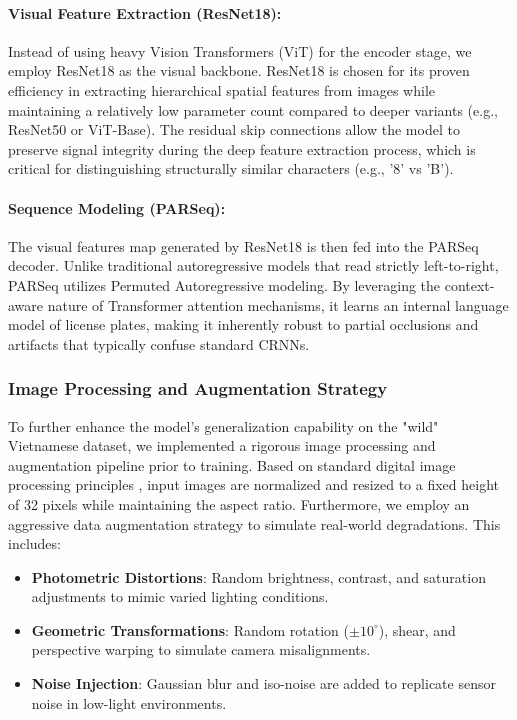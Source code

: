 \documentclass[a4paper,11pt,twocolumn]{article}
\begin{document}
	\paragraph{Visual Feature Extraction (ResNet18):}
	Instead of using heavy Vision Transformers (ViT) for the encoder stage, we employ ResNet18 \cite{He2015DeepRL} as the visual backbone. ResNet18 is chosen for its proven efficiency in extracting hierarchical spatial features from images while maintaining a relatively low parameter count compared to deeper variants (e.g., ResNet50 or ViT-Base). The residual skip connections allow the model to preserve signal integrity during the deep feature extraction process, which is critical for distinguishing structurally similar characters (e.g., '8' vs 'B').
	
	\paragraph{Sequence Modeling (PARSeq):}
	The visual features map generated by ResNet18 is then fed into the PARSeq \cite{Bautista2022SceneTR} decoder. Unlike traditional autoregressive models that read strictly left-to-right, PARSeq utilizes Permuted Autoregressive modeling. By leveraging the context-aware nature of Transformer attention mechanisms, it learns an internal language model of license plates, making it inherently robust to partial occlusions and artifacts that typically confuse standard CRNNs.
	
	\subsubsection{Image Processing and Augmentation Strategy}
	
	To further enhance the model's generalization capability on the "wild" Vietnamese dataset, we implemented a rigorous image processing and augmentation pipeline prior to training.
	Based on standard digital image processing principles \cite{Gonzalez2018DigitalIP}, input images are normalized and resized to a fixed height of 32 pixels while maintaining the aspect ratio.
	Furthermore, we employ an aggressive data augmentation strategy \cite{Shorten2019ASO} to simulate real-world degradations. This includes:
	\begin{itemize}
		\item \textbf{Photometric Distortions}: Random brightness, contrast, and saturation adjustments to mimic varied lighting conditions.
		\item \textbf{Geometric Transformations}: Random rotation ($\pm 10^\circ$), shear, and perspective warping to simulate camera misalignments.
		\item \textbf{Noise Injection}: Gaussian blur and iso-noise are added to replicate sensor noise in low-light environments.
	\end{itemize}
	
\end{document}
